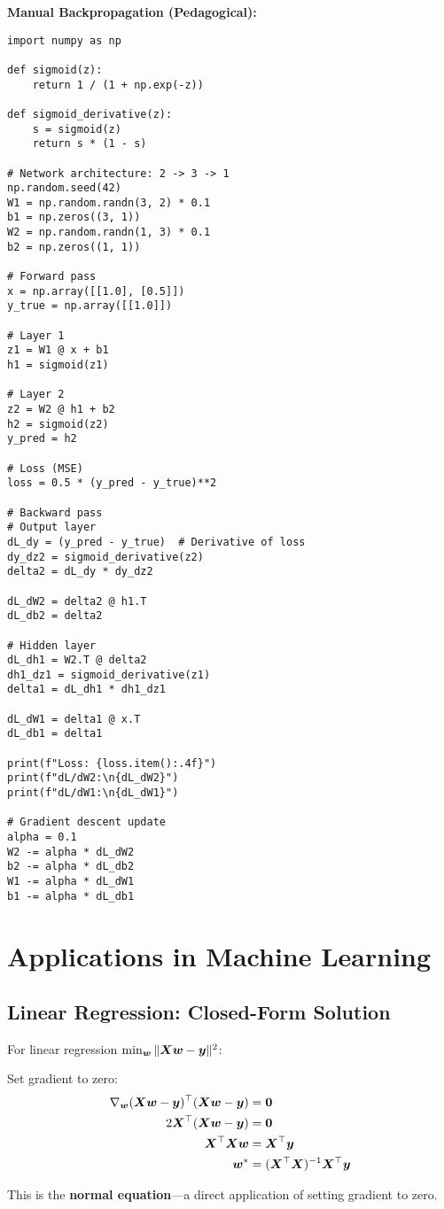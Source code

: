 \begin{codebox}
\textbf{Manual Backpropagation (Pedagogical):}

\begin{lstlisting}
import numpy as np

def sigmoid(z):
    return 1 / (1 + np.exp(-z))

def sigmoid_derivative(z):
    s = sigmoid(z)
    return s * (1 - s)

# Network architecture: 2 -> 3 -> 1
np.random.seed(42)
W1 = np.random.randn(3, 2) * 0.1
b1 = np.zeros((3, 1))
W2 = np.random.randn(1, 3) * 0.1
b2 = np.zeros((1, 1))

# Forward pass
x = np.array([[1.0], [0.5]])
y_true = np.array([[1.0]])

# Layer 1
z1 = W1 @ x + b1
h1 = sigmoid(z1)

# Layer 2
z2 = W2 @ h1 + b2
h2 = sigmoid(z2)
y_pred = h2

# Loss (MSE)
loss = 0.5 * (y_pred - y_true)**2

# Backward pass
# Output layer
dL_dy = (y_pred - y_true)  # Derivative of loss
dy_dz2 = sigmoid_derivative(z2)
delta2 = dL_dy * dy_dz2

dL_dW2 = delta2 @ h1.T
dL_db2 = delta2

# Hidden layer
dL_dh1 = W2.T @ delta2
dh1_dz1 = sigmoid_derivative(z1)
delta1 = dL_dh1 * dh1_dz1

dL_dW1 = delta1 @ x.T
dL_db1 = delta1

print(f"Loss: {loss.item():.4f}")
print(f"dL/dW2:\n{dL_dW2}")
print(f"dL/dW1:\n{dL_dW1}")

# Gradient descent update
alpha = 0.1
W2 -= alpha * dL_dW2
b2 -= alpha * dL_db2
W1 -= alpha * dL_dW1
b1 -= alpha * dL_db1
\end{lstlisting}
\end{codebox}

\section{Applications in Machine Learning}

\subsection{Linear Regression: Closed-Form Solution}

\begin{example}
For linear regression $\min_{\bm{w}} \|\bm{Xw} - \bm{y}\|^2$:

Set gradient to zero:
\begin{align}
    \nabla_{\bm{w}} (\bm{Xw} - \bm{y})^\top (\bm{Xw} - \bm{y}) &= \bm{0} \\
    2\bm{X}^\top(\bm{Xw} - \bm{y}) &= \bm{0} \\
    \bm{X}^\top \bm{Xw} &= \bm{X}^\top \bm{y} \\
    \bm{w}^* &= (\bm{X}^\top \bm{X})^{-1} \bm{X}^\top \bm{y}
\end{align}

This is the \textbf{normal equation}---a direct application of setting gradient to zero.
\end{example}

